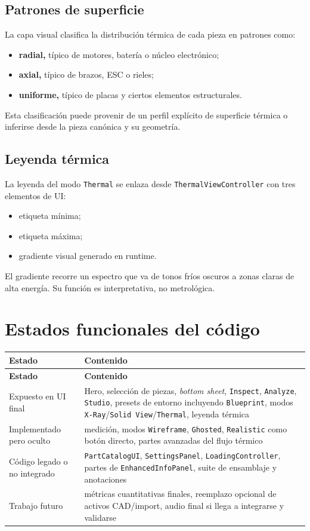 \documentclass[12pt,letterpaper]{article}
\begin{document}
\subsection{Patrones de superficie}
La capa visual clasifica la distribución térmica de cada pieza en patrones como:
\begin{itemize}
    \item \textbf{radial,} típico de motores, batería o núcleo electrónico;
    \item \textbf{axial,} típico de brazos, ESC o rieles;
    \item \textbf{uniforme,} típico de placas y ciertos elementos estructurales.
\end{itemize}

\noindent Esta clasificación puede provenir de un perfil explícito de superficie térmica o inferirse desde la pieza canónica y su geometría.

\subsection{Leyenda térmica}
La leyenda del modo \texttt{Thermal} se enlaza desde \texttt{ThermalViewController} con tres elementos de UI:
\begin{itemize}
    \item etiqueta mínima;
    \item etiqueta máxima;
    \item gradiente visual generado en runtime.
\end{itemize}

\noindent El gradiente recorre un espectro que va de tonos fríos oscuros a zonas claras de alta energía. Su función es interpretativa, no metrológica.

\section{Estados funcionales del código}

\begin{longtable}{p{4.7cm}p{8.1cm}}
\toprule
\textbf{Estado} & \textbf{Contenido} \\
\midrule
\endfirsthead
\toprule
\textbf{Estado} & \textbf{Contenido} \\
\midrule
\endhead
Expuesto en UI final & Hero, selección de piezas, \textit{bottom sheet}, \texttt{Inspect}, \texttt{Analyze}, \texttt{Studio}, presets de entorno incluyendo \texttt{Blueprint}, modos \texttt{X-Ray}/\texttt{Solid View}/\texttt{Thermal}, leyenda térmica \\
Implementado pero oculto & medición, modos \texttt{Wireframe}, \texttt{Ghosted}, \texttt{Realistic} como botón directo, partes avanzadas del flujo térmico \\
Código legado o no integrado & \texttt{PartCatalogUI}, \texttt{SettingsPanel}, \texttt{LoadingController}, partes de \texttt{EnhancedInfoPanel}, suite de ensamblaje y anotaciones \\
Trabajo futuro & métricas cuantitativas finales, reemplazo opcional de activos CAD/import, audio final si llega a integrarse y validarse \\
\bottomrule
\end{longtable}
\end{document}
